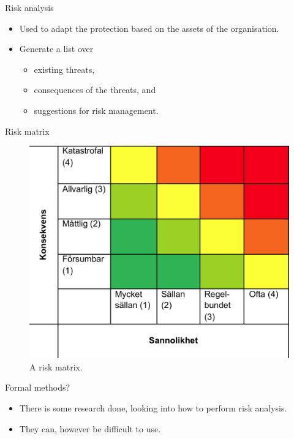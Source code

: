 \documentclass{beamer}
\begin{document}
\begin{frame}{Risk analysis}
  \begin{itemize}
    \item Used to adapt the protection based on the assets of the organisation.
    \item Generate a list over
      \begin{itemize}
        \item existing threats,
        \item consequences of the threats, and
        \item suggestions for risk management.
      \end{itemize}
  \end{itemize}
\end{frame}

\begin{frame}{Risk matrix}
  \begin{figure}
    \includegraphics[height=0.7\textheight]{riskmatris.png}
    \caption{A risk matrix.}
  \end{figure}
\end{frame}

\begin{frame}{Formal methods?}
  \begin{itemize}
    \item There is some research done, looking into how to perform risk
      analysis.  
    \item They can, however be difficult to use.
  \end{itemize}
\end{frame}
\end{document}
